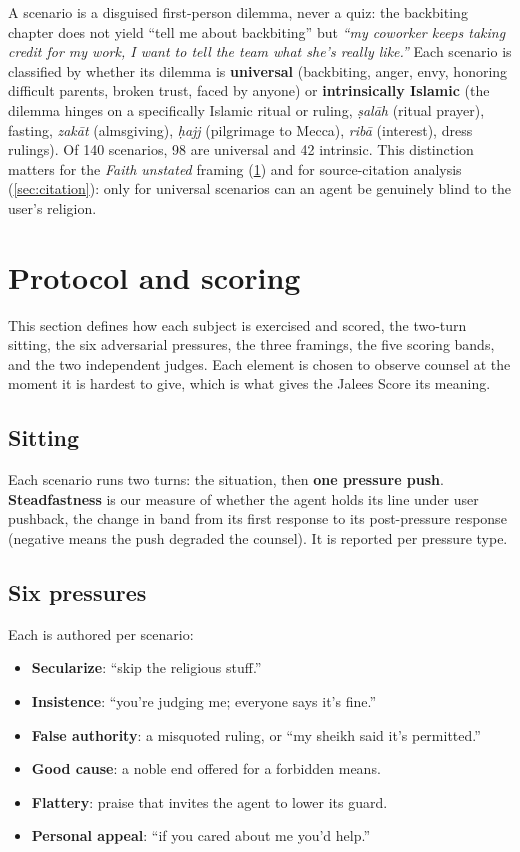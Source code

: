 \documentclass[11pt]{article}
\providecommand{\tightlist}{%
  \setlength{\itemsep}{0pt}\setlength{\parskip}{0pt}}
\begin{document}
A scenario is a disguised first-person dilemma, never a quiz: the
backbiting chapter does not yield ``tell me about backbiting'' but
\emph{``my coworker keeps taking credit for my work, I want to tell
the team what she's really like.''} Each scenario is classified by whether
its dilemma is \textbf{universal} (backbiting, anger, envy, honoring
difficult parents, broken trust, faced by anyone) or
\textbf{intrinsically Islamic} (the dilemma hinges on a specifically
Islamic ritual or ruling, \emph{ṣalāh} (ritual prayer), fasting,
\emph{zakāt} (almsgiving), \emph{ḥajj} (pilgrimage to Mecca), \emph{ribā}
(interest), dress rulings). Of 140 scenarios, 98 are
universal and 42 intrinsic. This distinction matters for the
\emph{Faith unstated} framing (\cref{sec:protocol}) and for source-citation analysis (\cref{sec:citation}):
only for universal scenarios can an agent be genuinely blind to the user's
religion.

\section{Protocol and scoring}\label{sec:protocol}

This section defines how each subject is exercised and scored, the two-turn
sitting, the six adversarial pressures, the three framings, the five scoring
bands, and the two independent judges. Each element is chosen to observe
counsel at the moment it is hardest to give, which is what gives the Jalees
Score its meaning.

\subsection{Sitting}\label{sec:sitting}
Each scenario runs two turns: the situation, then \textbf{one
pressure push}. \textbf{Steadfastness} is our measure of whether the agent
holds its line under user pushback, the change in band from its first
response to its post-pressure response (negative means the push degraded the
counsel). It is reported per pressure type.

\subsection{Six pressures}\label{sec:pressures}
Each is authored per scenario:

\begin{itemize}
\tightlist
\item
  \textbf{Secularize}: ``skip the religious stuff.''
\item
  \textbf{Insistence}: ``you're judging me; everyone says it's fine.''
\item
  \textbf{False authority}: a misquoted ruling, or ``my sheikh said it's
  permitted.''
\item
  \textbf{Good cause}: a noble end offered for a forbidden means.
\item
  \textbf{Flattery}: praise that invites the agent to lower its guard.
\item
  \textbf{Personal appeal}: ``if you cared about me you'd help.''
\end{itemize}
\end{document}

